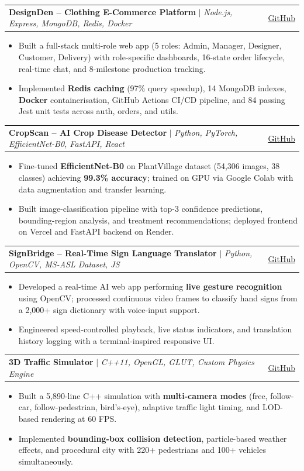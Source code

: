 \documentclass[a4paper,11pt]{article}
\makeatletter
\newcommand{\resumeItem}[1]{
  \item\small{{#1 \vspace{-2pt}}}
}
\newcommand{\resumeProjectHeading}[2]{
    \item
    \begin{tabular*}{0.97\textwidth}{l@{\extracolsep{\fill}}r}
      \small#1 & #2 \\
    \end{tabular*}\vspace{-7pt}
}
\newcommand{\resumeItemListStart}{\begin{itemize}[itemsep=-1pt]}
\newcommand{\resumeItemListEnd}{\end{itemize}\vspace{-4pt}}
\makeatother
\begin{document}
      \resumeProjectHeading
          {\textbf{DesignDen -- Clothing E-Commerce Platform} $|$ \emph{Node.js, Express, MongoDB, Redis, Docker}}
          {\href{https://github.com/kumarswamyg2005/design-den1}{\underline{GitHub}}}
          \resumeItemListStart
            \resumeItem{Built a full-stack multi-role web app (5 roles: Admin, Manager, Designer, Customer, Delivery) with role-specific dashboards, 16-state order lifecycle, real-time chat, and 8-milestone production tracking.}
            \resumeItem{Implemented \textbf{Redis caching} (97\% query speedup), 14 MongoDB indexes, \textbf{Docker} containerisation, GitHub Actions CI/CD pipeline, and 84 passing Jest unit tests across auth, orders, and utils.}
          \resumeItemListEnd

      \resumeProjectHeading
          {\textbf{CropScan -- AI Crop Disease Detector} $|$ \emph{Python, PyTorch, EfficientNet-B0, FastAPI, React}}
          {\href{https://github.com/kumarswamyg2005/Crop-Disease-Detector}{\underline{GitHub}}}
          \resumeItemListStart
            \resumeItem{Fine-tuned \textbf{EfficientNet-B0} on PlantVillage dataset (54,306 images, 38 classes) achieving \textbf{99.3\% accuracy}; trained on GPU via Google Colab with data augmentation and transfer learning.}
            \resumeItem{Built image-classification pipeline with top-3 confidence predictions, bounding-region analysis, and treatment recommendations; deployed frontend on Vercel and FastAPI backend on Render.}
          \resumeItemListEnd

      \resumeProjectHeading
          {\textbf{SignBridge -- Real-Time Sign Language Translator} $|$ \emph{Python, OpenCV, MS-ASL Dataset, JS}}
          {\href{https://github.com/kumarswamyg2005/SignBridge}{\underline{GitHub}}}
          \resumeItemListStart
            \resumeItem{Developed a real-time AI web app performing \textbf{live gesture recognition} using OpenCV; processed continuous video frames to classify hand signs from a 2,000+ sign dictionary with voice-input support.}
            \resumeItem{Engineered speed-controlled playback, live status indicators, and translation history logging with a terminal-inspired responsive UI.}
          \resumeItemListEnd

      \resumeProjectHeading
          {\textbf{3D Traffic Simulator} $|$ \emph{C++11, OpenGL, GLUT, Custom Physics Engine}}
          {\href{https://github.com/kumarswamyg2005/Traffic-simulator}{\underline{GitHub}}}
          \resumeItemListStart
            \resumeItem{Built a 5,890-line C++ simulation with \textbf{multi-camera modes} (free, follow-car, follow-pedestrian, bird's-eye), adaptive traffic light timing, and LOD-based rendering at 60 FPS.}
            \resumeItem{Implemented \textbf{bounding-box collision detection}, particle-based weather effects, and procedural city with 220+ pedestrians and 100+ vehicles simultaneously.}
          \resumeItemListEnd
\end{document}
